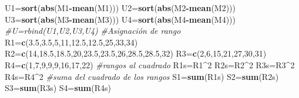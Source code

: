 \documentclass[a4paper,oneside,openany]{book}
\newenvironment{Shaded}{\begin{snugshade}}{\end{snugshade}}
\newcommand{\KeywordTok}[1]{\textcolor[rgb]{0.13,0.29,0.53}{\textbf{#1}}}
\newcommand{\DecValTok}[1]{\textcolor[rgb]{0.00,0.00,0.81}{#1}}
\newcommand{\FloatTok}[1]{\textcolor[rgb]{0.00,0.00,0.81}{#1}}
\newcommand{\CommentTok}[1]{\textcolor[rgb]{0.56,0.35,0.01}{\textit{#1}}}
\newcommand{\OperatorTok}[1]{\textcolor[rgb]{0.81,0.36,0.00}{\textbf{#1}}}
\newcommand{\NormalTok}[1]{#1}
\begin{document}
\begin{Shaded}
\begin{Highlighting}[]
\NormalTok{U1=}\KeywordTok{sort}\NormalTok{(}\KeywordTok{abs}\NormalTok{(M1}\OperatorTok{-}\KeywordTok{mean}\NormalTok{(M1)))}
\NormalTok{U2=}\KeywordTok{sort}\NormalTok{(}\KeywordTok{abs}\NormalTok{(M2}\OperatorTok{-}\KeywordTok{mean}\NormalTok{(M2)))}
\NormalTok{U3=}\KeywordTok{sort}\NormalTok{(}\KeywordTok{abs}\NormalTok{(M3}\OperatorTok{-}\KeywordTok{mean}\NormalTok{(M3)))}
\NormalTok{U4=}\KeywordTok{sort}\NormalTok{(}\KeywordTok{abs}\NormalTok{(M4}\OperatorTok{-}\KeywordTok{mean}\NormalTok{(M4)))}
\CommentTok{#U=rbind(U1,U2,U3,U4)}
\CommentTok{#Asignación de rango}
\NormalTok{R1=}\KeywordTok{c}\NormalTok{(}\FloatTok{3.5}\NormalTok{,}\FloatTok{3.5}\NormalTok{,}\DecValTok{5}\NormalTok{,}\DecValTok{11}\NormalTok{,}\FloatTok{12.5}\NormalTok{,}\FloatTok{12.5}\NormalTok{,}\DecValTok{25}\NormalTok{,}\DecValTok{33}\NormalTok{,}\DecValTok{34}\NormalTok{)}
\NormalTok{R2=}\KeywordTok{c}\NormalTok{(}\DecValTok{14}\NormalTok{,}\FloatTok{18.5}\NormalTok{,}\FloatTok{18.5}\NormalTok{,}\DecValTok{20}\NormalTok{,}\FloatTok{23.5}\NormalTok{,}\FloatTok{23.5}\NormalTok{,}\DecValTok{26}\NormalTok{,}\FloatTok{28.5}\NormalTok{,}\FloatTok{28.5}\NormalTok{,}\DecValTok{32}\NormalTok{)}
\NormalTok{R3=}\KeywordTok{c}\NormalTok{(}\DecValTok{2}\NormalTok{,}\DecValTok{6}\NormalTok{,}\DecValTok{15}\NormalTok{,}\DecValTok{21}\NormalTok{,}\DecValTok{27}\NormalTok{,}\DecValTok{30}\NormalTok{,}\DecValTok{31}\NormalTok{)}
\NormalTok{R4=}\KeywordTok{c}\NormalTok{(}\DecValTok{1}\NormalTok{,}\DecValTok{7}\NormalTok{,}\DecValTok{9}\NormalTok{,}\DecValTok{9}\NormalTok{,}\DecValTok{9}\NormalTok{,}\DecValTok{16}\NormalTok{,}\DecValTok{17}\NormalTok{,}\DecValTok{22}\NormalTok{)}
\CommentTok{#rangos al cuadrado}
\NormalTok{R1s=R1}\OperatorTok{^}\DecValTok{2}
\NormalTok{R2s=R2}\OperatorTok{^}\DecValTok{2}
\NormalTok{R3s=R3}\OperatorTok{^}\DecValTok{2}
\NormalTok{R4s=R4}\OperatorTok{^}\DecValTok{2}
\CommentTok{#suma del cuadrado de los rangos}
\NormalTok{S1=}\KeywordTok{sum}\NormalTok{(R1s)}
\NormalTok{S2=}\KeywordTok{sum}\NormalTok{(R2s)}
\NormalTok{S3=}\KeywordTok{sum}\NormalTok{(R3s)}
\NormalTok{S4=}\KeywordTok{sum}\NormalTok{(R4s)}


\end{Highlighting}
\end{Shaded}
\end{document}
